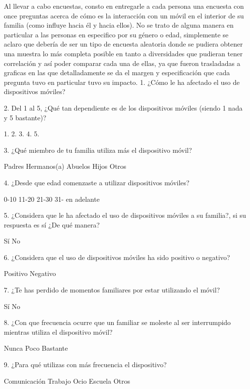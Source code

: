 \documentclass[10pt,a4paper]{article}
\begin{document}
Al llevar a cabo encuestas, consto en entregarle a cada persona una encuesta con once preguntas acerca de c{\'o}mo es la interacci{\'o}n con un m{\'o}vil en el interior de su familia (como influye hacia {\'e}l y hacia ellos). No se trato de alguna manera en particular a las personas en especifico por su g{\'e}nero o edad, simplemente se aclaro que deber{\'i}a de ser un tipo de encuesta aleatoria donde se pudiera obtener una muestra lo m{\'a}s completa posible en tanto a diversidades que pudieran tener correlaci{\'o}n y as{\'i} poder comparar cada una de ellas, ya que fueron trasladadas a graficas en las que detalladamente se da el margen y especificaci{\'o}n que cada pregunta tuvo en particular tuvo su impacto. 
1.	¿C{\'o}mo le ha afectado el uso de dispositivos m{\'o}viles? 

2.	Del 1 al 5, ¿Qu{\'e} tan dependiente es de los dispositivos m{\'o}viles (siendo 1 nada y 5 bastante)?

1.              2.              3.              4.             5.

3.	¿Qu{\'e} miembro de tu familia utiliza m{\'a}s el dispositivo m{\'o}vil?

Padres    Hermanos(a)    Abuelos    Hijos    Otros

4.	¿Desde que edad comenzaste a utilizar dispositivos m{\'o}viles?

0-10          11-20          21-30          31- en adelante

5.	¿Considera que le ha afectado el uso de dispositivos m{\'o}viles a su familia?, si su respuesta es s{\'i} ¿De qu{\'e} manera?

        S{\'i}                                                                              No

6.	¿Considera que el uso de dispositivos m{\'o}viles ha sido positivo o negativo? 

Positivo                    Negativo

7.	¿Te has perdido de momentos familiares por estar utilizando el m{\'o}vil? 

S{\'i}                       No

8.	¿Con que frecuencia ocurre que un familiar se moleste al ser interrumpido mientras utiliza el dispositivo m{\'o}vil? 

Nunca                 Poco                 Bastante

9.	¿Para qu{\'e} utilizas con m{\'a}s frecuencia  el dispositivo?

Comunicaci{\'o}n        Trabajo        Ocio        Escuela        Otros
\end{document}
